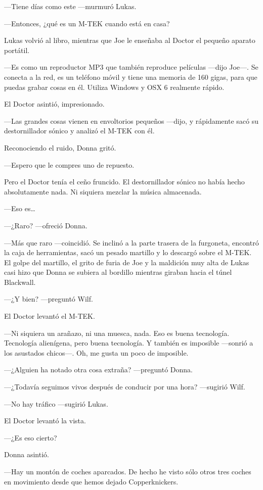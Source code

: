 ---Tiene días como este ---murmuró Lukas.

---Entonces, ¿qué es un M-TEK cuando está en casa?

Lukas volvió al libro, mientras que Joe le enseñaba al Doctor el pequeño
aparato portátil.

---Es como un reproductor MP3 que también reproduce películas ---dijo
Joe---. Se conecta a la red, es un teléfono móvil y tiene una memoria de
160 gigas, para que puedas grabar cosas en él. Utiliza Windows y OSX 6
realmente rápido.

El Doctor asintió, impresionado.

---Las grandes cosas vienen en envoltorios pequeños ---dijo, y
rápidamente sacó su destornillador sónico y analizó el M-TEK con él.

Reconociendo el ruido, Donna gritó.

---Espero que le compres uno de repuesto.

Pero el Doctor tenía el ceño fruncido. El destornillador sónico no había
hecho absolutamente nada. Ni siquiera mezclar la música almacenada.

---Eso es\ldots{}

---¿Raro? ---ofreció Donna.

---Más que raro ---coincidió. Se inclinó a la parte trasera de la
furgoneta, encontró la caja de herramientas, sacó un pesado martillo y
lo descargó sobre el M-TEK. El golpe del martillo, el grito de furia de
Joe y la maldición muy alta de Lukas casi hizo que Donna se subiera al
bordillo mientras giraban hacia el túnel Blackwall.

---¿Y bien? ---preguntó Wilf.

El Doctor levantó el M-TEK.

---Ni siquiera un arañazo, ni una muesca, nada. Eso es buena tecnología.
Tecnología alienígena, pero buena tecnología. Y también es imposible
---sonrió a los asustados chicos---. Oh, me gusta un poco de imposible.

---¿Alguien ha notado otra cosa extraña? ---preguntó Donna.

---¿Todavía seguimos vivos después de conducir por una hora? ---sugirió
Wilf.

---No hay tráfico ---sugirió Lukas.

El Doctor levantó la vista.

---¿Es eso cierto?

Donna asintió.

---Hay un montón de coches aparcados. De hecho he visto sólo otros tres
coches en movimiento desde que hemos dejado Copperknickers.



